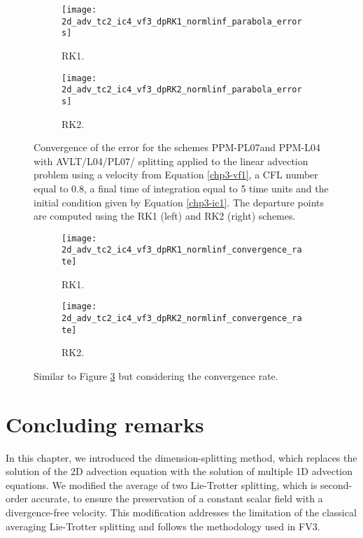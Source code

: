 \begin{figure}[!htb]
	\centering
	\begin{subfigure}{0.45\textwidth}
		\centering
		\texttt{[image: 2d\_adv\_tc2\_ic4\_vf3\_dpRK1\_normlinf\_parabola\_errors]}
		\caption{RK1.\label{chp3-sec-exp-adv2-error1}}
	\end{subfigure}
	\begin{subfigure}{0.45\textwidth}
		\centering
		\texttt{[image: 2d\_adv\_tc2\_ic4\_vf3\_dpRK2\_normlinf\_parabola\_errors]}
		\caption{RK2.\label{chp3-sec-exp-adv2-error2}}
	\end{subfigure}
	\caption{Convergence of the error for the schemes
	PPM-PL07and PPM-L04 with AVLT/L04/PL07/ splitting
	applied to the linear advection problem using a velocity from Equation \eqref{chp3-vf1},
	a CFL number equal to $0.8$, a final time of integration equal to 5 time units
	and the initial condition given by Equation \eqref{chp3-ic1}.
	The departure points are computed using the RK1 (left) and RK2 (right) schemes.\label{chp3-sec-exp-adv2-error}}
\end{figure}

\begin{figure}[!htb]
	\centering
	\begin{subfigure}{0.45\textwidth}
		\centering
		\texttt{[image: 2d\_adv\_tc2\_ic4\_vf3\_dpRK1\_normlinf\_convergence\_rate]}
		\caption{RK1.\label{chp3-sec-exp-adv2-cr1}}
	\end{subfigure}
	\begin{subfigure}{0.45\textwidth}
		\centering
		\texttt{[image: 2d\_adv\_tc2\_ic4\_vf3\_dpRK2\_normlinf\_convergence\_rate]}
		\caption{RK2.\label{chp3-sec-exp-adv2-cr2}}
	\end{subfigure}
	\caption{Similar to Figure \ref{chp3-sec-exp-adv2-error} but considering the convergence rate.\label{chp3-sec-exp-adv2-cr}}
\end{figure}


\section{Concluding remarks}
In this chapter, we introduced the dimension-splitting method, which replaces
the solution of the 2D advection equation with the solution of multiple 1D advection equations.
We modified the average of two Lie-Trotter splitting, which is second-order accurate,
to ensure the preservation of a constant scalar field with a divergence-free velocity.
This modification addresses the limitation of the classical averaging Lie-Trotter
splitting and follows the methodology used in FV3.

